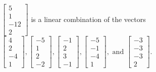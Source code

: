 \begin{exercise}
\begin{exerciseStatement}
  \end{exerciseStatement}
  \begin{exerciseAnswer}
   \(\left[\begin{array}{c}
5 \\
1 \\
-12 \\
2
\end{array}\right]\) 
  	 is  
	a linear combination of the vectors \(\left[\begin{array}{c}
4 \\
2 \\
-4 \\
1
\end{array}\right] , \left[\begin{array}{c}
-5 \\
1 \\
2 \\
-2
\end{array}\right] , \left[\begin{array}{c}
-1 \\
2 \\
3 \\
-1
\end{array}\right] , \left[\begin{array}{c}
-5 \\
-1 \\
-4 \\
1
\end{array}\right] , \text{ and } \left[\begin{array}{c}
-3 \\
-3 \\
-3 \\
2
\end{array}\right]\).

	
  


  \end{exerciseAnswer}
\end{exercise}